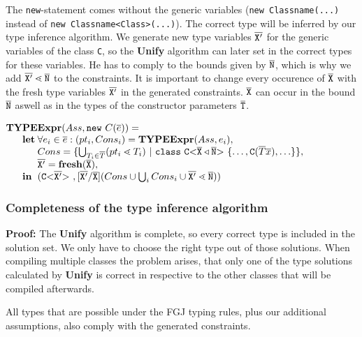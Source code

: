 \documentclass[runningheads]{llncs}
\begin{document}
\smallskip

The \texttt{new}-statement comes without the generic variables
(\texttt{new Classname(...)} instead of \texttt{new Classname<Class>(...)}).
The correct type will be inferred by our type inference algorithm.
We generate new type variables $\overline{\tt X'}$ for the generic variables of the class \texttt{C},
so the \textbf{Unify} algorithm can later set in the correct types for these variables.
He has to comply to the bounds given by $\overline{\tt N}$, which is why we add $\overline{\tt X'} \lessdot \overline{\tt N}$ to the constraints.
It is important to change every occurence of $\overline{\tt X}$ with the fresh type variables $\overline{\tt X'}$ in the generated constraints.
$\overline{\tt X}$ can occur in the bound $\overline{\tt N}$ aswell as in the types of the constructor parameters $\overline{\tt T}$.

$\begin{array}{@{}l@{}l@{}l}
\textbf{TY}& \textbf{PE} & \textbf{Expr} (Ass, \mathtt{new }\ C(\overline{e}) ) = \\
& \textbf{let} %
& \forall e_i \in \overline{e} : (pt_i, Cons_i) = \textbf{TYPEExpr}(Ass, e_i)  ,\\
& & Cons = \{ \bigcup_{T_i \in \overline{T}} (pt_i \lessdot T_i) \ | \ \mathtt{class }\ \exptype{C}{\ol{X} \triangleleft \ol{N}}\{ \ldots, \texttt{C}(\overline{T} \overline{x}), \ldots \} \},\\
& & \ol{X'} = \textbf{fresh}(\ol{X}),\\
& \mathbf{in}%
& (\exptype{C}{\ol{X'}}, [\ol{X'}/\ol{X}](Cons \cup \bigcup_i Cons_i \cup \ol{X'} \lessdot \ol{N}))\\
\end{array}
$

\subsubsection{Completeness of the type inference algorithm}
\textbf{Proof:} The \textbf{Unify} algorithm is complete, so every correct type is included in the solution set.
We only have to choose the right type out of those solutions.
When compiling multiple classes the problem arises,
that only one of the type solutions calculated by \textbf{Unify} is correct
in respective to the other classes that will be compiled afterwards.

All types that are possible under the FGJ typing rules, plus our additional assumptions,
also comply with the generated constraints.
\end{document}
